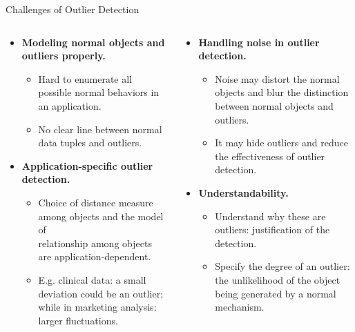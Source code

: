 \begin{frame}{Challenges of Outlier Detection}
	\begin{columns}
		\begin{column}{0.55\textwidth}
			\begin{itemize}
				\item \textbf{Modeling normal objects and outliers properly.}
				      \begin{itemize}
					      \item Hard to enumerate all possible normal behaviors in an application.
					      \item No clear line between normal data tuples and outliers.
				      \end{itemize}
				\item \textbf{Application-specific outlier detection.}
				      \begin{itemize}
					      \item Choice of distance measure among objects and the model of \\
					            relationship among objects are application-dependent.
					      \item E.g. clinical data: a small deviation could be an outlier; \\
					            while in marketing analysis: larger fluctuations.
				      \end{itemize}
			\end{itemize}
		\end{column}

		\begin{column}{0.45\textwidth}
			\begin{itemize}
				\item \textbf{Handling noise in outlier detection.}
				      \begin{itemize}
					      \item Noise may distort the normal objects and blur the distinction \\
					            between normal objects and outliers.
					      \item It may hide outliers and reduce the effectiveness of outlier detection.
				      \end{itemize}
				\item \textbf{Understandability.}
				      \begin{itemize}
					      \item Understand why these are outliers: justification of the detection.
					      \item Specify the degree of an outlier: \\
					            the unlikelihood of the object being generated by a normal mechanism.
				      \end{itemize}
			\end{itemize}
		\end{column}
	\end{columns}

\end{frame}
